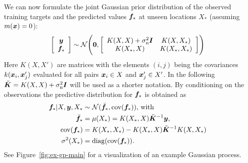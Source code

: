 We can now formulate the joint Gaussian prior distribution of the observed 
training targets and the predicted values $\bm{f}_*$ at unseen locations $X_*$ 
(assuming $m(\bm{x}) = 0$):
\begin{equation}
    \left[ \begin{array}{c}\vc y \\ \vc f_* \end{array} \right]
    \sim\mathcal{N}\!\del{\vc{0}, \sbr{\begin{array}{cc} K(X, X) 
                + \sigma\ped{n}^2 \mat I & K(X, X_*) \\ K(X_*, X) & K(X_*, X_*) 
            \end{array}}}
\end{equation}
Here $K(X, X')$ are matrices with the elements $(i, j)$ being the covariances 
$k(\bm{x}_i, \bm{x}'_j)$ evaluated for all pairs $\bm{x}_i \in X$ and $\bm{x}'_j \in 
X'$. In the following $\tilde{\bm{K}} = K(X, X) + \sigma_{\mathrm{n}}^2 \bm{I}$ will 
be used as a shorter notation. By conditioning on the observations the 
predictive distribution for $\bm{f}_*$ is obtained as
\begin{align}
    \bm{f}_* | X, \bm{y}, X_* &\sim \mathcal{N}(\bar{\bm{f}_*}, \operatorname{cov}(\bm{f}_*))\text{, with}\\
    \bar{\bm{f}_*} &= \mu(X_*) = K(X_*, X)\tilde{\bm{K}}^{-1} \bm{y}\text{,} 
    \label{eqn:meanpred} \\
    \operatorname{cov}(\bm{f}_*) &= K(X_*, X_*) - K(X_*, X)\tilde{\bm{K}}^{-1}K(X, X_*) 
    \label{eqn:covpred} \\
    \sigma^2(X_*) &= \operatorname{diag}(\operatorname{cov}(\bm{f}_*)) \text{.}
\end{align}
See Figure~\ref{fig:ex-gp-main} for a visualization of an example Gaussian 
process.

